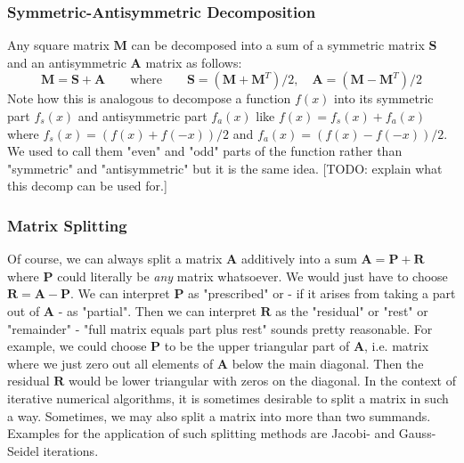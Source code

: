 \subsubsection{Symmetric-Antisymmetric Decomposition}
Any square matrix $\mathbf{M}$ can be decomposed into a sum of a symmetric matrix $\mathbf{S}$ and an antisymmetric $\mathbf{A}$ matrix as follows:
\begin{equation}
\mathbf{M} = \mathbf{S + A} \qquad \text{where}  \qquad
\mathbf{S} = (\mathbf{M} + \mathbf{M}^T) / 2,  \quad
\mathbf{A} = (\mathbf{M} - \mathbf{M}^T) / 2
\end{equation}
Note how this is analogous to decompose a function $f(x)$ into its symmetric part $f_s(x)$ and antisymmetric part $f_a(x)$ like $f(x) = f_s(x) + f_a(x)$ where $f_s(x) = (f(x) + f(-x)) / 2$ and $f_a(x) = (f(x) - f(-x)) / 2$. We used to call them "even" and "odd" parts of the function rather than "symmetric" and "antisymmetric" but it is the same idea. [TODO: explain what this decomp can be used for.]




\subsubsection{Matrix Splitting}
Of course, we can always split a matrix $\mathbf{A}$ additively into a sum $\mathbf{A} = \mathbf{P + R}$ where $\mathbf{P}$ could literally be \emph{any} matrix whatsoever. We would just have to choose $\mathbf{R} = \mathbf{A - P}$. We can interpret $\mathbf{P}$ as "prescribed" or - if it arises from taking a part out of $\mathbf{A}$ - as "partial". Then we can interpret $\mathbf{R}$ as the "residual" or "rest" or "remainder" - "full matrix equals part plus rest" sounds pretty reasonable. For example, we could choose $\mathbf{P}$ to be the upper triangular part of $\mathbf{A}$, i.e. matrix where we just zero out all elements of $\mathbf{A}$ below the main diagonal. Then the residual $\mathbf{R}$ would be lower triangular with zeros on the diagonal. In the context of iterative numerical algorithms, it is sometimes desirable to split a matrix in such a way. Sometimes, we may also split a matrix into more than two summands. Examples for the application of such splitting methods are Jacobi- and Gauss-Seidel iterations.

